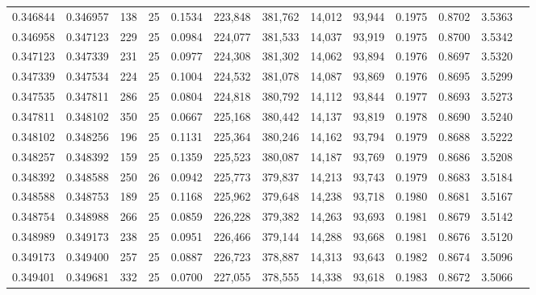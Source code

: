\begin{tabular}{rrrrrrrrrrrrr}
0.346844 & 0.346957 &   138 &  25 &                                     0.1534 & 223,848 & 381,762 &  14,012 &  93,944 & 0.1975 & 0.8702 & 3.5363 \\
0.346958 & 0.347123 &   229 &  25 &                                     0.0984 & 224,077 & 381,533 &  14,037 &  93,919 & 0.1975 & 0.8700 & 3.5342 \\
0.347123 & 0.347339 &   231 &  25 &                                     0.0977 & 224,308 & 381,302 &  14,062 &  93,894 & 0.1976 & 0.8697 & 3.5320 \\
0.347339 & 0.347534 &   224 &  25 &                                     0.1004 & 224,532 & 381,078 &  14,087 &  93,869 & 0.1976 & 0.8695 & 3.5299 \\
0.347535 & 0.347811 &   286 &  25 &                                     0.0804 & 224,818 & 380,792 &  14,112 &  93,844 & 0.1977 & 0.8693 & 3.5273 \\
0.347811 & 0.348102 &   350 &  25 &                                     0.0667 & 225,168 & 380,442 &  14,137 &  93,819 & 0.1978 & 0.8690 & 3.5240 \\
0.348102 & 0.348256 &   196 &  25 &                                     0.1131 & 225,364 & 380,246 &  14,162 &  93,794 & 0.1979 & 0.8688 & 3.5222 \\
0.348257 & 0.348392 &   159 &  25 &                                     0.1359 & 225,523 & 380,087 &  14,187 &  93,769 & 0.1979 & 0.8686 & 3.5208 \\
0.348392 & 0.348588 &   250 &  26 &                                     0.0942 & 225,773 & 379,837 &  14,213 &  93,743 & 0.1979 & 0.8683 & 3.5184 \\
0.348588 & 0.348753 &   189 &  25 &                                     0.1168 & 225,962 & 379,648 &  14,238 &  93,718 & 0.1980 & 0.8681 & 3.5167 \\
0.348754 & 0.348988 &   266 &  25 &                                     0.0859 & 226,228 & 379,382 &  14,263 &  93,693 & 0.1981 & 0.8679 & 3.5142 \\
0.348989 & 0.349173 &   238 &  25 &                                     0.0951 & 226,466 & 379,144 &  14,288 &  93,668 & 0.1981 & 0.8676 & 3.5120 \\
0.349173 & 0.349400 &   257 &  25 &                                     0.0887 & 226,723 & 378,887 &  14,313 &  93,643 & 0.1982 & 0.8674 & 3.5096 \\
0.349401 & 0.349681 &   332 &  25 &                                     0.0700 & 227,055 & 378,555 &  14,338 &  93,618 & 0.1983 & 0.8672 & 3.5066 \\

\end{tabular}
